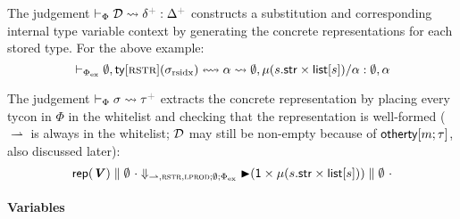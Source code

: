 \documentclass[9pt,preprint]{sigplanconf}
\newcommand{\moutput}{^{\color{gray}{+}}}
\begin{document}
The judgement $\vdash_\Phi \memD \leadsto \delta\moutput : \Delta\moutput$ constructs a substitution and corresponding internal type variable context by generating the concrete representations for each stored type. For the above example: \[\vdash_{\Phi_\text{ex}} \emptyset, {\sf ty}[\textsc{rstr}](\sigma_\text{rsidx}) \leftrightsquigarrow \alpha \leadsto \emptyset, \mu(s.{\sf str} \times {\sf list}[s])/\alpha : \emptyset, \alpha\]

The judgement $\sfinalrepX{\st}{\tau\moutput}$ extracts the concrete representation by placing every tycon in $\Phi$ in the whitelist and checking that the representation is well-formed (${\rightharpoonup}$ is always in the whitelist; $\mathcal{D}$ may still be non-empty because of ${\sf otherty}[m; \tau]$, also discussed later):\[{\sf rep}({\textbf{\textit{V}}}) \parallel \emptyset~\cdot \Downarrow_{{\rightharpoonup},\textsc{rstr},\textsc{lprod}; \emptyset; \Phi_\text{ex}} {\blacktriangleright}({\sf 1}\times\mu(s.{\sf str}\times{\sf list}[s])) \parallel \emptyset~\cdot\]%

\paragraph{Variables}
\end{document}
